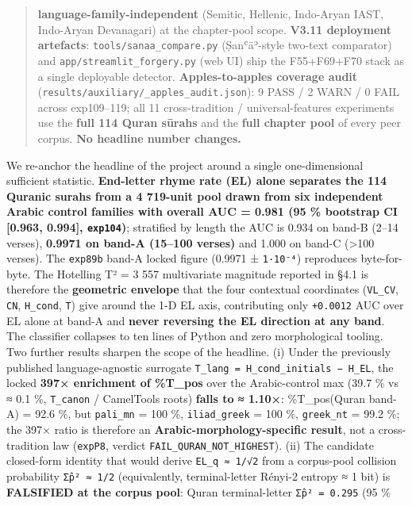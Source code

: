 \documentclass[
]{article}
\begin{document}
\begin{quote}
\textbf{language-family-independent} (Semitic, Hellenic, Indo-Aryan
IAST, Indo-Aryan Devanagari) at the chapter-pool scope. \textbf{V3.11
deployment artefacts}: \texttt{tools/sanaa\_compare.py} (Ṣanʿāʾ-style
two-text comparator) and \texttt{app/streamlit\_forgery.py} (web UI)
ship the F55+F69+F70 stack as a single deployable detector.
\textbf{Apples-to-apples coverage audit}
(\texttt{results/auxiliary/\_apples\_audit.json}): 9 PASS / 2 WARN / 0
FAIL across exp109--119; all 11 cross-tradition / universal-features
experiments use the \textbf{full 114 Quran sūrahs} and the \textbf{full
chapter pool} of every peer corpus. \textbf{No headline number changes.}
\end{quote}

We re-anchor the headline of the project around a single one-dimensional
sufficient statistic. \textbf{End-letter rhyme rate (EL) alone separates
the 114 Quranic surahs from a 4 719-unit pool drawn from six independent
Arabic control families with overall AUC = 0.981 (95 \% bootstrap CI
{[}0.963, 0.994{]}, \texttt{exp104})}; stratified by length the AUC is
0.934 on band-B (2--14 verses), \textbf{0.9971 on band-A (15--100
verses)} and 1.000 on band-C (\textgreater100 verses). The
\texttt{exp89b} band-A locked figure (0.9971 ± \texttt{1·10⁻⁴})
reproduces byte-for-byte. The Hotelling T² = 3 557 multivariate
magnitude reported in §4.1 is therefore the \textbf{geometric envelope}
that the four contextual coordinates (\texttt{VL\_CV}, \texttt{CN},
\texttt{H\_cond}, \texttt{T}) give around the 1-D EL axis, contributing
only \texttt{+0.0012} AUC over EL alone at band-A and \textbf{never
reversing the EL direction at any band}. The classifier collapses to ten
lines of Python and zero morphological tooling. Two further results
sharpen the scope of the headline. (i) Under the previously published
language-agnostic surrogate
\texttt{T\_lang\ =\ H\_cond\_initials\ −\ H\_EL}, the locked
\textbf{397× enrichment of \%T\_pos} over the Arabic-control max (39.7
\% vs ≈ 0.1 \%, \texttt{T\_canon} / CamelTools roots) \textbf{falls to ≈
1.10×}: \%T\_pos(Quran band-A) = 92.6 \%, but \texttt{pali\_mn} = 100
\%, \texttt{iliad\_greek} = 100 \%, \texttt{greek\_nt} = 99.2 \%; the
397× ratio is therefore an \textbf{Arabic-morphology-specific result},
not a cross-tradition law (\texttt{expP8}, verdict
\texttt{FAIL\_QURAN\_NOT\_HIGHEST}). (ii) The candidate closed-form
identity that would derive \texttt{EL\_q\ ≈\ 1/√2} from a corpus-pool
collision probability \texttt{Σp̂²\ ≈\ 1/2} (equivalently,
terminal-letter Rényi-2 entropy ≈ 1 bit) is \textbf{FALSIFIED at the
corpus pool}: Quran terminal-letter \texttt{Σp̂²\ =\ 0.295} (95 \%
\end{document}
